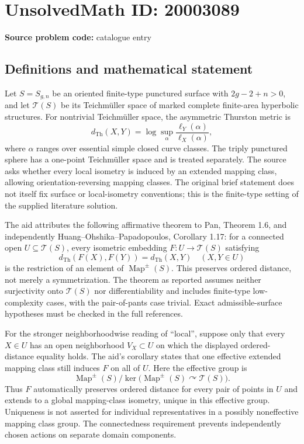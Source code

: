 \documentclass[11pt]{article}
\begin{document}
\section*{UnsolvedMath ID: 20003089}
\textbf{Source problem code:} catalogue entry
\subsection{Definitions and mathematical statement}
Let $S=S_{g,n}$ be an oriented finite-type punctured surface with $2g-2+n>0$, and let $\mathcal T(S)$ be its Teichm\"uller space of marked complete finite-area hyperbolic structures. For nontrivial Teichm\"uller space, the asymmetric Thurston metric is
\[
d_{\mathrm{Th}}(X,Y)=\log\sup_{\alpha}\frac{\ell_Y(\alpha)}{\ell_X(\alpha)},
\]
where $\alpha$ ranges over essential simple closed curve classes. The triply punctured sphere has a one-point Teichm\"uller space and is treated separately. The source asks whether every local isometry is induced by an extended mapping class, allowing orientation-reversing mapping classes. The original brief statement does not itself fix surface or local-isometry conventions; this is the finite-type setting of the supplied literature solution.

The aid attributes the following affirmative theorem to Pan, Theorem 1.6, and independently Huang--Ohshika--Papadopoulos, Corollary 1.17: for a connected open $U\subseteq\mathcal T(S)$, every isometric embedding $F:U\to\mathcal T(S)$ satisfying
\[
d_{\mathrm{Th}}(F(X),F(Y))=d_{\mathrm{Th}}(X,Y)
\quad(X,Y\in U)
\]
is the restriction of an element of $\operatorname{Map}^{\pm}(S)$. This preserves ordered distance, not merely a symmetrization. The theorem as reported assumes neither surjectivity onto $\mathcal T(S)$ nor differentiability and includes finite-type low-complexity cases, with the pair-of-pants case trivial. Exact admissible-surface hypotheses must be checked in the full references.

For the stronger neighborhoodwise reading of ``local'', suppose only that every $X\in U$ has an open neighborhood $V_X\subset U$ on which the displayed ordered-distance equality holds. The aid's corollary states that one effective extended mapping class still induces $F$ on all of $U$. Here the effective group is
\[
\operatorname{Map}^{\pm}(S)\big/\ker\bigl(\operatorname{Map}^{\pm}(S)\curvearrowright\mathcal T(S)\bigr).
\]
Thus $F$ automatically preserves ordered distance for every pair of points in $U$ and extends to a global mapping-class isometry, unique in this effective group. Uniqueness is not asserted for individual representatives in a possibly noneffective mapping class group. The connectedness requirement prevents independently chosen actions on separate domain components.
\end{document}
